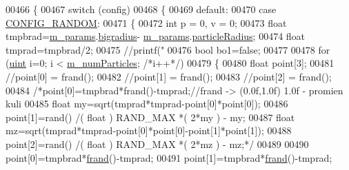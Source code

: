 \begin{DoxyCode}
00466 \{
00467     \textcolor{keywordflow}{switch} (config)
00468     \{
00469         \textcolor{keywordflow}{default}:
00470         \textcolor{keywordflow}{case} \hyperlink{class_particle_system_a1dca3996c8068602412ef9f7826605d1a053c69e4e6b094605ea152a644e7c9ee}{CONFIG\_RANDOM}:
00471             \{
00472                 \textcolor{keywordtype}{int} p = 0, v = 0;
00473                                 \textcolor{keywordtype}{float} tmpbrad=\hyperlink{class_particle_system_ab765472aed6a1b5f0d2f98a3a906c417}{m\_params}.\hyperlink{struct_sim_params_af41979948fdd8f76fe28ce2b43eb24cd}{bigradius}-
      \hyperlink{class_particle_system_ab765472aed6a1b5f0d2f98a3a906c417}{m\_params}.\hyperlink{struct_sim_params_a7e131c24e1020c44173deb0f57a8c4af}{particleRadius};
00474                                 \textcolor{keywordtype}{float} tmprad=tmpbrad/2;
00475                                 \textcolor{comment}{//printf("%
00476                                 \textcolor{keywordtype}{bool} bo1=\textcolor{keyword}{false};
00477 
00478                 \textcolor{keywordflow}{for} (\hyperlink{particles__kernel_8cuh_a91ad9478d81a7aaf2593e8d9c3d06a14}{uint} i=0; i < \hyperlink{class_particle_system_a23d238efa80a647d4b6cde034f486a91}{m\_numParticles}; \textcolor{comment}{/*i++*/})
00479                 \{
00480                     \textcolor{keywordtype}{float} point[3];
00481                     \textcolor{comment}{//point[0] = frand();}
00482                     \textcolor{comment}{//point[1] = frand();}
00483                     \textcolor{comment}{//point[2] = frand();}
00484                                         \textcolor{comment}{/*point[0]=tmpbrad*frand()-tmprad;//frand -> (0.0f,1.0f) 1.0f -
       promien kuli}
00485 \textcolor{comment}{                                        float my=sqrt(tmprad*tmprad-point[0]*point[0]);}
00486 \textcolor{comment}{                                        point[1]=rand() /( float ) RAND\_MAX *( 2*my ) - my;}
00487 \textcolor{comment}{                                        float mz=sqrt(tmprad*tmprad-point[0]*point[0]-point[1]*point[1]);}
00488 \textcolor{comment}{                                        point[2]=rand() /( float ) RAND\_MAX *( 2*mz ) - mz;*/}
00489 
00490                                         point[0]=tmpbrad*\hyperlink{particle_system_8cpp_a5459f6b6b39f9a6b80de7f17c3777ee2}{frand}()-tmprad;
00491                                         point[1]=tmpbrad*\hyperlink{particle_system_8cpp_a5459f6b6b39f9a6b80de7f17c3777ee2}{frand}()-tmprad;
}
\end{DoxyCode}
